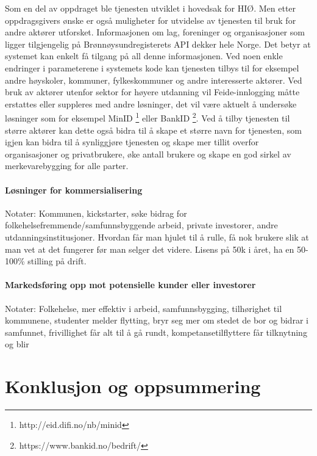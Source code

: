 Som en del av oppdraget ble tjenesten utviklet i hovedsak for HIØ. Men etter oppdragsgivers ønske er også muligheter for utvidelse av tjenesten til bruk for andre aktører utforsket. Informasjonen om lag, foreninger og organisasjoner som ligger tilgjengelig på Brønnøysundregisterets API dekker hele Norge. Det betyr at systemet kan enkelt få tilgang på all denne informasjonen. Ved noen enkle endringer i parameterene i systemets kode kan tjenesten tilbys til for eksempel andre høyskoler, kommuner, fylkeskommuner og andre interesserte aktører. Ved bruk av aktører utenfor sektor for høyere utdanning vil Feide-innlogging måtte erstattes eller suppleres med andre løsninger, det vil være aktuelt å undersøke løsninger som for eksempel MinID \footnote{http://eid.difi.no/nb/minid} eller BankID \footnote{https://www.bankid.no/bedrift/}. Ved å tilby tjenesten til større aktører kan dette også bidra til å skape et større navn for tjenesten, som igjen kan bidra til å synliggjøre tjenesten og skape mer tillit overfor organisasjoner og privatbrukere, øke antall brukere og skape en god sirkel av merkevarebygging for alle parter.

\paragraph{Løsninger for kommersialisering}
Notater:
Kommunen, kickstarter, søke bidrag for folkehelsefremmende/samfunnsbyggende arbeid, private investorer, andre utdanningsinstitusjoner. Hvordan får man hjulet til å rulle, få nok brukere slik at man vet at det fungerer før man selger det videre. Lisens på 50k i året, ha en 50-100\% stilling på drift.

\paragraph{Markedsføring opp mot potensielle kunder eller investorer}
Notater:
Folkehelse, mer effektiv i arbeid, samfunnsbygging, tilhørighet til kommunene, studenter melder flytting, bryr seg mer om stedet de bor og bidrar i samfunnet, frivillighet får alt til å gå rundt, kompetansetilflyttere får tilknytning og blir


\section{Konklusjon og oppsummering}







